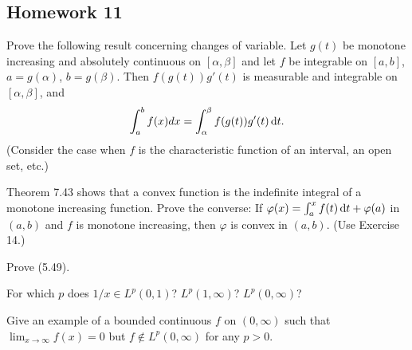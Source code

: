 \subsection{Homework 11}
\begin{problem}
  Prove the following result concerning changes of variable. Let $g(t)$ be
  monotone increasing and absolutely continuous on $[\alpha,\beta]$ and let
  $f$ be integrable on $[a,b]$, $a= g(\alpha)$, $b= g(\beta)$. Then
  $f(g(t))g'(t)$ is measurable and integrable on $[\alpha,\beta]$, and
  \[
    \int_a^b f(x)d x=\int_\alpha^\beta f(g(t))g'(t)\mathop{}\!\mathrm{d} t.
  \]
  (Consider the case when $f$ is the characteristic function of an
  interval, an open set, etc.)
\end{problem}
\begin{solution}
\end{solution}

\begin{problem}
  Theorem 7.43 shows that a convex function is the indefinite integral of a
  monotone increasing function. Prove the converse: If
  $\varphi(x)=\int_a^xf(t)\mathop{}\!\mathrm{d} t+\varphi(a)$ in $(a,b)$ and $f$ is
  monotone increasing, then $\varphi$ is convex in $(a,b)$. (Use Exercise
  14.)
\end{problem}
\begin{solution}
\end{solution}

\begin{problem}
  Prove (5.49).
\end{problem}
\begin{solution}
\end{solution}

\begin{problem}
  For which $p$ does $1/x\in L^p(0,1)$? $L^p(1,\infty)$? $L^p(0,\infty)$?
\end{problem}
\begin{solution}
\end{solution}

\begin{problem}
  Give an example of a bounded continuous $f$ on $(0,\infty)$ such that
  $\lim_{x\to\infty}f(x)=0$ but $f\notin L^p(0,\infty)$ for any $p>0$.
\end{problem}
\begin{solution}
\end{solution}

